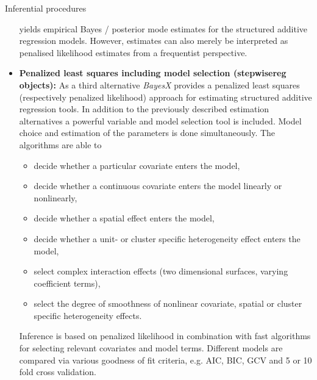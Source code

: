 \begin{stanza}{Inferential procedures}
\begin{itemize}
    yields empirical Bayes / posterior mode estimates for the structured additive regression models. However, estimates can
    also merely be interpreted as penalised likelihood estimates from a frequentist perspective.
\item{\bf \sffamily Penalized least squares including model selection (stepwisereg objects):}
As a third alternative {\em BayesX} provides a penalized least squares (respectively penalized likelihood) approach for
estimating structured additive regression tools.
In addition to
the previously described estimation alternatives a powerful variable and model selection tool is included.  Model choice and estimation of
the parameters is done simultaneously. The algorithms are able to
\begin{itemize}
\item decide whether a particular covariate enters the model,
\item decide whether a continuous covariate enters the model linearly or nonlinearly,
\item decide whether a spatial effect enters the model,
\item decide whether a unit- or cluster specific heterogeneity effect enters the model,
\item select complex interaction effects (two dimensional surfaces, varying coefficient terms),
\item select the degree of smoothness of  nonlinear covariate, spatial or cluster specific heterogeneity effects.
\end{itemize}
Inference is based on penalized likelihood in combination with fast
algorithms for selecting relevant covariates and model terms.
Different models are compared via various goodness of fit criteria,
e.g. AIC, BIC, GCV and 5 or 10 fold cross validation.
\end{itemize}
\end{stanza}


